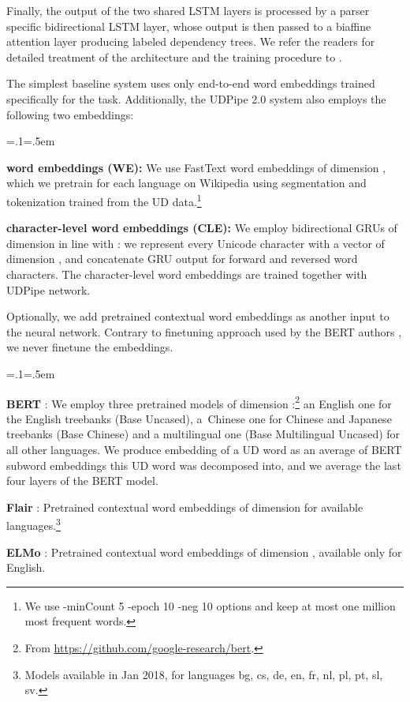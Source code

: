 \documentclass[11pt,a4paper]{article}
\newenvironment{citemize}{\begin{list}{}{\topsep=.1\smallskipamount\itemsep=0pt\parsep=1pt\labelwidth=.5em}}{\end{list}}
\begin{document}
Finally, the output of the two shared LSTM layers is processed by
a parser specific bidirectional LSTM layer, whose output is then passed to
a biaffine attention layer \cite{dozat:2016} producing labeled dependency
trees. We refer the readers for detailed treatment of the architecture and
the training procedure to \citet{UDPipe2.0}.

The simplest baseline system uses only end-to-end word embeddings trained
specifically for the task.
Additionally, the UDPipe 2.0 system also employs the following two embeddings:
\begin{citemize}
  \item \textbf{word embeddings (WE):} We use FastText word embeddings
    \cite{FastText} of dimension , which we pretrain for each language
    on Wikipedia using segmentation and tokenization trained from the UD
    data.\footnote{We use {\scriptsize\ttfamily-minCount 5 -epoch 10 -neg 10}
    options and keep at most one million most frequent words.}
  \item \textbf{character-level word embeddings (CLE):} We employ bidirectional
    GRUs of dimension  in line with
    \citet{Ling2015}: we represent every Unicode character with a vector of
    dimension , and concatenate GRU output for forward and reversed word
    characters. The character-level word embeddings are trained together with
    UDPipe network.
\end{citemize}

Optionally, we add pretrained contextual word embeddings as another input
to the neural network. Contrary to finetuning approach used by the BERT
authors \citep{BERT}, we never finetune the embeddings.

\begin{citemize}
    \item \textbf{BERT} \cite{BERT}: We employ three pretrained models of dimension :\footnote{From
    \scriptsize\url{https://github.com/google-research/bert}.}
    an English one for the English treebanks ({\footnotesize\ttfamily Base Uncased}), a~Chinese
    one for Chinese and Japanese treebanks ({\footnotesize\ttfamily Base Chinese}) and
    a multilingual one ({\footnotesize\ttfamily Base Multilingual Uncased}) for all other languages.
    We produce embedding of a UD word as an average
    of BERT subword embeddings this UD word was decomposed into, and we
    average the last four layers of the BERT model.
    \item \textbf{Flair} \cite{Akbik}: Pretrained contextual word
    embeddings of dimension  for available languages.\footnote{Models
    available in Jan 2018, for languages {\scriptsize\ttfamily bg}, {\scriptsize\ttfamily cs},
    {\scriptsize\ttfamily de}, {\scriptsize\ttfamily en}, {\scriptsize\ttfamily fr}, {\scriptsize\ttfamily nl},
    {\scriptsize\ttfamily pl}, {\scriptsize\ttfamily pt}, {\scriptsize\ttfamily sl}, {\scriptsize\ttfamily sv}.}
    \item \textbf{ELMo} \cite{Peters2018}: Pretrained contextual
    word embeddings of dimension , available only for English.
\end{citemize}
\end{document}
